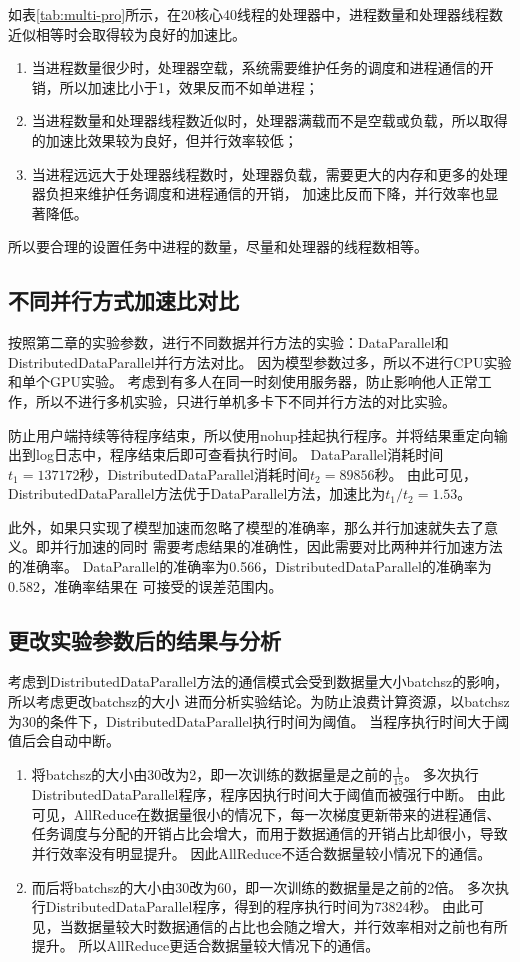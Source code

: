 如表\ref{tab:multi-pro}所示，在20核心40线程的处理器中，进程数量和处理器线程数近似相等时会取得较为良好的加速比。
\begin{enumerate}
    \item 当进程数量很少时，处理器空载，系统需要维护任务的调度和进程通信的开销，所以加速比小于1，效果反而不如单进程；
    \item 当进程数量和处理器线程数近似时，处理器满载而不是空载或负载，所以取得的加速比效果较为良好，但并行效率较低；
    \item 当进程远远大于处理器线程数时，处理器负载，需要更大的内存和更多的处理器负担来维护任务调度和进程通信的开销，
    加速比反而下降，并行效率也显著降低。
\end{enumerate}
所以要合理的设置任务中进程的数量，尽量和处理器的线程数相等。

\subsection{不同并行方式加速比对比}

按照第二章的实验参数，进行不同数据并行方法的实验：DataParallel和DistributedDataParallel并行方法对比。
因为模型参数过多，所以不进行CPU实验和单个GPU实验。
考虑到有多人在同一时刻使用服务器，防止影响他人正常工作，所以不进行多机实验，只进行单机多卡下不同并行方法的对比实验。

防止用户端持续等待程序结束，所以使用nohup挂起执行程序。并将结果重定向输出到log日志中，程序结束后即可查看执行时间。
DataParallel消耗时间$t_1=137172$秒，DistributedDataParallel消耗时间$t_2=89856$秒。
由此可见，DistributedDataParallel方法优于DataParallel方法，加速比为$t_1/t_2=1.53$。

此外，如果只实现了模型加速而忽略了模型的准确率，那么并行加速就失去了意义。即并行加速的同时
需要考虑结果的准确性，因此需要对比两种并行加速方法的准确率。
DataParallel的准确率为0.566，DistributedDataParallel的准确率为0.582，准确率结果在
可接受的误差范围内。

\subsection{更改实验参数后的结果与分析}

考虑到DistributedDataParallel方法的通信模式会受到数据量大小batchsz的影响，所以考虑更改batchsz的大小
进而分析实验结论。为防止浪费计算资源，以batchsz为30的条件下，DistributedDataParallel执行时间为阈值。
当程序执行时间大于阈值后会自动中断。

\begin{enumerate}
    \item 将batchsz的大小由30改为2，即一次训练的数据量是之前的$\frac{1}{15}$。
    多次执行DistributedDataParallel程序，程序因执行时间大于阈值而被强行中断。
    由此可见，AllReduce在数据量很小的情况下，每一次梯度更新带来的进程通信、
    任务调度与分配的开销占比会增大，而用于数据通信的开销占比却很小，导致并行效率没有明显提升。
    因此AllReduce不适合数据量较小情况下的通信。
    \item 而后将batchsz的大小由30改为60，即一次训练的数据量是之前的2倍。
    多次执行DistributedDataParallel程序，得到的程序执行时间为73824秒。
    由此可见，当数据量较大时数据通信的占比也会随之增大，并行效率相对之前也有所提升。
    所以AllReduce更适合数据量较大情况下的通信。
\end{enumerate}
